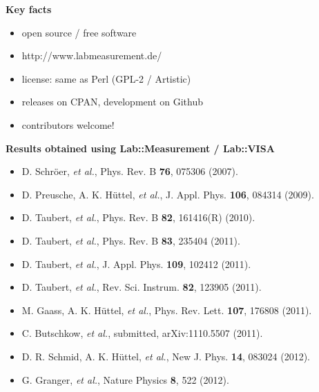 \documentclass[portrait]{a0poster}
\newcommand{\heading}[1]{
  {\color{heading}\boldmath\textbf{\huge #1}}\\[\medskipamount]
}
\newcommand{\verysmallheading}[1]{
  {\color{heading}\textbf{\large #1}}\\
}
\begin{document}
{\begin{minipage}[t][\columnheighta-2\fboxsep-2\fboxrule][t]
\begin{minipage}{\textwidth}
\vspace*{2cm}
\heading{Key facts}
\vspace*{-2cm}
\begin{itemize}
 \item
 open source / free software\\[-5cm]
 \item 
 http://www.labmeasurement.de/
 \hfill{}
 \item
 license: same as Perl (GPL-2 / Artistic)
 \item
 releases on CPAN, development on Github
 \item
 contributors welcome!
\end{itemize}






\vspace*{3cm}
\begin{minipage}{\textwidth}
\verysmallheading{Results obtained using Lab::Measurement / Lab::VISA}
{\renewcommand{\baselinestretch}{0.4}\normalsize
\begin{itemize}
\item D. Schr\"oer, {\it et al.}, Phys. Rev. B {\bf 76}, 075306 (2007).
\item D. Preusche, A. K. H\"uttel, {\it et al.}, J. Appl. Phys. {\bf 106},
084314 (2009).
\item D. Taubert, {\it et al.}, Phys. Rev. B {\bf 82}, 161416(R) (2010).
\item D. Taubert, {\it et al.}, Phys. Rev. B {\bf 83}, 235404 (2011).
\item D. Taubert, {\it et al.}, J. Appl. Phys. {\bf 109}, 102412 (2011).
\item D. Taubert, {\it et al.}, Rev. Sci. Instrum. {\bf 82}, 123905 (2011).
\item M. Gaass, A. K. H\"uttel, {\it et al.}, Phys. Rev. Lett. {\bf 107}, 176808
(2011).
\item C. Butschkow, {\it et al.}, submitted, arXiv:1110.5507 (2011).
\item D. R. Schmid, A. K. H\"uttel, {\it et al.}, New J. Phys. {\bf 14}, 083024 
(2012).
\item G. Granger, {\it et al.}, Nature Physics {\bf 8}, 522 (2012).


\end{itemize}
\renewcommand{\baselinestretch}{1}}
\end{minipage}



%
%
%
%
\end{minipage}
\end{minipage}}
\end{document}
